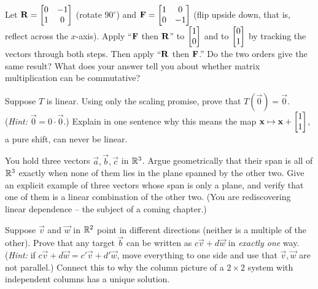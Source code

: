 \begin{exercise}
Let $\mathbf{R}=\begin{bmatrix}0&-1\\1&0\end{bmatrix}$ (rotate $90^\circ$) and
$\mathbf{F}=\begin{bmatrix}1&0\\0&-1\end{bmatrix}$ (flip upside down, that is, reflect across the $x$-axis). Apply ``$\mathbf{F}$ then $\mathbf{R}$'' to
$\begin{bmatrix}1\\0\end{bmatrix}$ and to $\begin{bmatrix}0\\1\end{bmatrix}$ by tracking the vectors through both steps. Then apply
``$\mathbf{R}$ then $\mathbf{F}$.'' Do the two orders give the same result? What does your answer tell you
about whether matrix multiplication can be commutative?
\end{exercise}

\begin{exercise}
Suppose $T$ is linear. Using only the scaling promise, prove that $T(\vec 0) = \vec 0$.
(\emph{Hint:} $\vec 0 = 0\cdot\vec 0$.) Explain in one sentence why this means the map
$\mathbf{x} \mapsto \mathbf{x} + \begin{bmatrix}1\\1\end{bmatrix}$, a pure shift, can never be linear.
\end{exercise}

\begin{exercise}
You hold three vectors $\vec a,\vec b,\vec c$ in $\mathbb{R}^3$. Argue geometrically that their span is all of
$\mathbb{R}^3$ exactly when none of them lies in the plane spanned by the other two. Give an explicit example
of three vectors whose span is only a plane, and verify that one of them is a linear combination of the
other two. (You are rediscovering linear dependence -- the subject of a coming chapter.)
\end{exercise}

\begin{exercise}
Suppose $\vec v$ and $\vec w$ in $\mathbb{R}^2$ point in different directions (neither is a multiple of the
other). Prove that any target $\vec b$ can be written as $c\vec v + d\vec w$ in \emph{exactly one}
way. (\emph{Hint:} if $c\vec v + d\vec w = c'\vec v + d'\vec w$, move everything to one side and use
that $\vec v,\vec w$ are not parallel.) Connect this to why the column picture of a $2\times2$ system
with independent columns has a unique solution.
\end{exercise}
